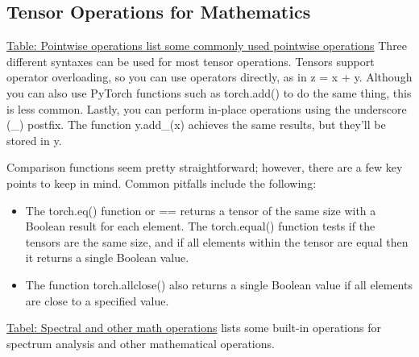 \subsection{Tensor Operations for Mathematics}
\href{wwww}{Table: Pointwise operations list some commonly used pointwise operations}
Three different syntaxes can be used for most tensor operations. Tensors support operator overloading, so you can
use operators directly, as in \textsf{z = x + y}. Although you can
also use PyTorch functions such as torch.add() to do the
same thing, this is less common. Lastly, you can perform
in-place operations using the underscore (\_) postfix. The
function \textsf{y.add\_(x)} achieves the same results, but they’ll
be stored in y.

Comparison functions seem pretty straightforward; however, there are a few key points to keep in mind. Common pitfalls
include the following:
\begin{itemize}
    \item The torch.eq() function or == returns a tensor of the same size with a Boolean result for each element. The torch.equal() function tests if the tensors are the same size, and if all elements within the tensor are equal then it returns a single Boolean value.
    \item The function torch.allclose() also returns a single Boolean value if all elements are close to a specified value.
\end{itemize}
\href{www}{Tabel: Spectral and other math operations} lists some built-in operations for spectrum analysis and other mathematical operations.